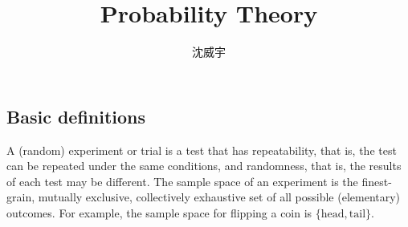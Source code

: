 \documentclass[a4paper,12pt]{report}
\begin{document}
\title{Probability Theory}
\author{沈威宇}
\date{\temtoday}
\titletocdoc
{}
\subsection{Basic definitions}
A (random) experiment or trial is a test that has repeatability, that is, the test can be repeated under the same conditions, and randomness, that is, the results of each test may be different.
The sample space of an experiment is the finest-grain, mutually exclusive, collectively exhaustive set of all possible (elementary) outcomes. For example, the sample space for flipping a coin is $\{\text{head}, \text{tail}\}$.
\end{document}
